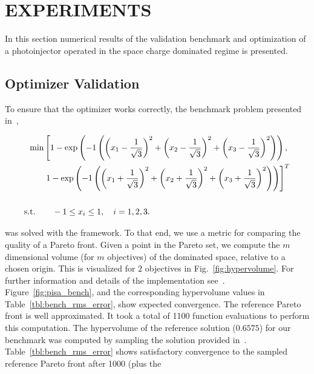 \section{EXPERIMENTS} \label{sec:experiments}

In this section numerical results of the validation benchmark and optimization 
of a photoinjector operated in the space charge dominated regime is presented.

\subsection{Optimizer Validation}
To ensure that the optimizer works correctly, the benchmark problem presented in~\cite{hbwh:05}, 
  \begin{widetext}
  	\begin{align} \label{eqn:bench}
  	\text{min} & \left[ 1 - \exp \left( -1 \left(
  	\left(x_1 - \frac{1}{\sqrt{3}} \right)^2 +
  	\left(x_2 - \frac{1}{\sqrt{3}} \right)^2 +
  	\left(x_3 - \frac{1}{\sqrt{3}} \right)^2 \right)\right), \right. \\
  	\vspace{3em} 
  	& \left. 1 - \exp \left( -1 \left(
  	\left(x_1 + \frac{1}{\sqrt{3}} \right)^2 +
  	\left(x_2 + \frac{1}{\sqrt{3}} \right)^2 +
  	\left(x_3 + \frac{1}{\sqrt{3}} \right)^2 \right)\right) \right]^T \nonumber \\
  	\vspace{3em} \nonumber \\
  	\text{s.t.} \quad & \quad -1 \le x_i \le 1, \quad i=1,2,3 \nonumber
  	\text{.} \nonumber
  	\end{align}
  \end{widetext}
was solved with the framework.  
To that end, we use a metric for comparing the quality of a Pareto front.
Given a point in the Pareto set, we compute the $m$ dimensional volume (for
  $m$ objectives) of the dominated space, relative to a chosen origin.
This is visualized for $2$ objectives in Fig.~\ref{fig:hypervolume}.
For further information and details of the implementation see~\cite{whbb:12}.
Figure~\ref{fig:pisa_bench}, and the corresponding hypervolume values in
Table~\ref{tbl:bench_rms_error}, show expected convergence.
The reference Pareto front is well approximated.
It took a total of 1100 function evaluations to perform this computation.
The hypervolume of the reference solution ($0.6575$) for our benchmark was
 computed by sampling the solution provided in~\cite{hbwh:05}.
 Table~\ref{tbl:bench_rms_error} shows satisfactory
 convergence to the sampled reference Pareto front after 1000 (plus the
